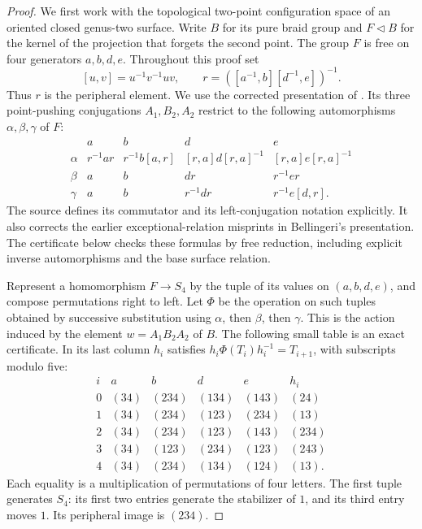 \begin{proof}
We first work with the topological two-point configuration space of an
oriented closed genus-two surface. Write $B$ for its pure braid group
and $F\triangleleft B$ for the kernel of the projection that forgets
the second point. The group $F$ is free on four generators
$a,b,d,e$. Throughout this proof set
\[
 [u,v]=u^{-1}v^{-1}uv,
 \qquad r=([a^{-1},b][d^{-1},e])^{-1}.
\]
Thus $r$ is the peripheral element. We use the corrected presentation
of \citet[Proposition 4, preprint p.~5]{A_BardakovBellingeri2009}.
Its three point-pushing conjugations $A_1,B_2,A_2$ restrict to the
following automorphisms $\alpha,\beta,\gamma$ of $F$:
\[
\begin{array}{c|cccc}
 &a&b&d&e\\ \hline
\alpha&r^{-1}ar&r^{-1}b[a,r]&[r,a]d[r,a]^{-1}&[r,a]e[r,a]^{-1}\\
\beta&a&b&dr&r^{-1}er\\
\gamma&a&b&r^{-1}dr&r^{-1}e[d,r].
\end{array}
\]
The source defines its commutator and its left-conjugation notation
explicitly. It also corrects the earlier exceptional-relation
misprints in Bellingeri's presentation. The certificate below checks
these formulas by free reduction, including explicit inverse
automorphisms and the base surface relation.

Represent a homomorphism $F\to S_4$ by the tuple of its values on
$(a,b,d,e)$, and compose permutations right to left. Let $\Phi$ be the
operation on such tuples obtained by successive substitution using
$\alpha$, then $\beta$, then $\gamma$. This is the action induced by
the element $w=A_1B_2A_2$ of $B$. The following small table is an exact
certificate. In its last column $h_i$ satisfies
$h_i\Phi(T_i)h_i^{-1}=T_{i+1}$, with subscripts modulo five:
\[
\begin{array}{c|cccc|c}
i&a&b&d&e&h_i\\ \hline
0&(34)&(234)&(134)&(143)&(24)\\
1&(34)&(234)&(123)&(234)&(13)\\
2&(34)&(234)&(123)&(143)&(234)\\
3&(34)&(123)&(234)&(123)&(243)\\
4&(34)&(234)&(134)&(124)&(13).
\end{array}
\]
Each equality is a multiplication of permutations of four letters.
The first tuple generates $S_4$: its first two entries generate the
stabilizer of $1$, and its third entry moves $1$. Its peripheral image
is $(234)$.


\end{proof}
